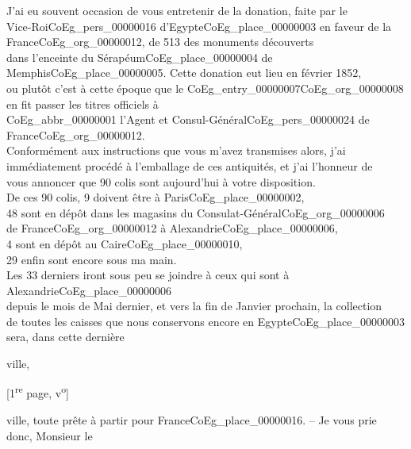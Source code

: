 \documentclass{book}
\begin{document}
\indent J’ai eu souvent occasion de vous entretenir de la donation, faite par le\\
Vice-Roi\gls{CoEg_pers_00000016} d’Egypte\gls{CoEg_place_00000003} en faveur de la France\gls{CoEg_org_00000012}, de 513 des monuments découverts\\
dans l’enceinte du Sérapéum\gls{CoEg_place_00000004} de Memphis\gls{CoEg_place_00000005}. Cette donation eut lieu en février 1852,\\
ou plutôt c’est à cette époque que le \Gls{CoEg_entry_00000007}\gls{CoEg_org_00000008} en fit passer les titres officiels à\\
\gls{CoEg_abbr_00000001} l’Agent et Consul-Général\gls{CoEg_pers_00000024} de France\gls{CoEg_org_00000012}.\\
\indent Conformément aux instructions que vous m’avez transmises alors, j’ai\\
immédiatement procédé à l’emballage de ces antiquités, et j’ai l’honneur de\\
vous annoncer que 90 colis sont aujourd’hui à votre disposition.\\
\indent De ces 90 colis, 9 doivent être à Paris\gls{CoEg_place_00000002},\\
\indent \hspace{2cm}48 sont en dépôt dans les magasins du Consulat-Général\gls{CoEg_org_00000006}\\
\indent \hspace{3cm} de France\gls{CoEg_org_00000012} à Alexandrie\gls{CoEg_place_00000006},\\
\indent \hspace{2cm} 4 sont en dépôt au Caire\gls{CoEg_place_00000010},\\
\indent \hspace{2cm} 29 enfin sont encore sous ma main.\\
\indent Les 33 derniers iront sous peu se joindre à ceux qui sont à Alexandrie\gls{CoEg_place_00000006}\\
depuis le mois de Mai dernier, et vers la fin de Janvier prochain, la collection\\
de toutes les caisses que nous conservons encore en Egypte\gls{CoEg_place_00000003} sera, dans cette dernière
\begin{flushright}ville,\end{flushright}
{\footnotesize\begin{center} {[1\textsuperscript{re} page, v\textsuperscript{o}]}\end{center}}
\noindent ville, toute prête à partir pour France\gls{CoEg_place_00000016}. – Je vous prie donc, Monsieur le\\
\end{document}
